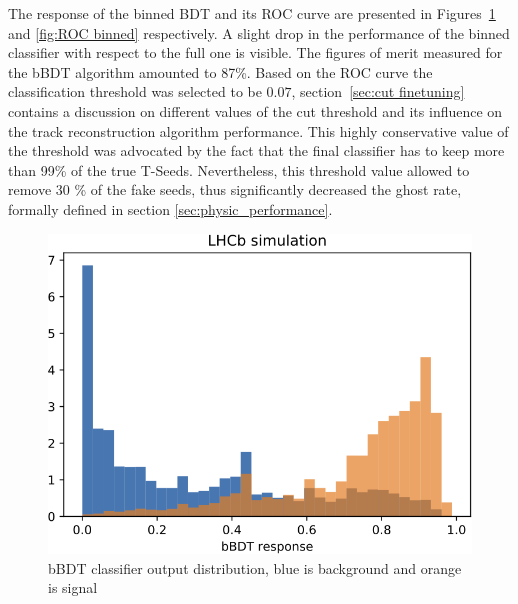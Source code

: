 The response of the binned BDT and its ROC curve are presented in Figures~\ref{fig:bbdt response} and \ref{fig:ROC binned} respectively. A slight drop in the performance of the binned classifier with respect to the full one is visible. The figures of merit measured for the bBDT algorithm amounted to 87\%. Based on the ROC curve the classification threshold was selected to be $0.07$, section~\ref{sec:cut finetuning} contains a discussion on different values of the cut threshold and its influence on the track reconstruction algorithm performance. This highly conservative value of the threshold was advocated by the fact that the final classifier has to keep more than 99\% of the true T-Seeds. Nevertheless, this threshold value allowed to remove 30 \% of the fake seeds, thus significantly decreased the ghost rate, formally defined in section \ref{sec:physic_performance}. 

\begin{figure}
\centering
\includegraphics[scale=0.6]{figures/bbdt_response.png}
\caption{bBDT classifier output distribution, blue is background and orange is signal }
\label{fig:bbdt response}
\end{figure}


